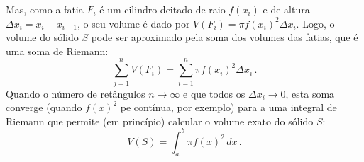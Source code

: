 \begin{center}
\begin{bmlimage}
\end{bmlimage}
\end{center}


Mas, como a fatia $F_i$ é um cilindro deitado de 
raio $f(x_i)$ e de altura $\Delta x_i=x_i-x_{i-1}$, o seu
volume é dado por $V(F_i)=\pi f(x_i)^2\Delta x_i$.
Logo, o volume do sólido $S$ pode ser aproximado 
pela soma dos volumes das fatias, que é 
uma soma de Riemann:
$$
\sum_{j=1}^nV(F_i)=\sum_{i=1}^n\pi f(x_i)^2\Delta x_i\,.
$$
Quando o número de retângulos
$n\to \infty$ e que todos os $\Delta x_i\to 0$, esta soma
converge (quando $f(x)^2$ pe contínua, por exemplo) 
para a uma integral de
Riemann que permite (em princípio) calcular o volume exato do sólido $S$:
\begin{equation}\label{eq_formula_volume}
\boxed{V(S)=\int_a^b\pi f(x)^2\,dx\,.}
\end{equation}

